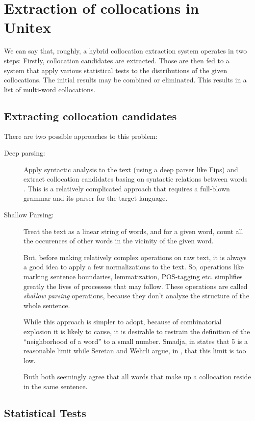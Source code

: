 \documentclass[a4paper,12pt,oneside]{article}
\begin{document}
\section{Extraction of collocations in Unitex}
We can say that, roughly, a hybrid collocation extraction system operates in two
steps: Firstly, collocation candidates are extracted. Those are then fed to a
system that apply various statistical tests to the distributions of the given
collocations. The initial results may be combined or eliminated. This results in
a list of multi-word collocations.

\subsection{Extracting collocation candidates}
There are two possible approaches to this problem: 

\begin{description}
\item[Deep parsing:] Apply syntactic analysis to the text (using a deep parser
like Fips\cite{fips2007}) and extract collocation candidates basing on syntactic
relations between words \cite{SeretanWehrli2006ACL}. This is a relatively
complicated approach that requires a full-blown grammar and its parser for the
target language.

\item[Shallow Parsing:] Treat the text as a linear string of words, and for a
given word, count all the occurences of other words in the vicinity of the given
word. 

But, before making relatively complex operations on raw text, it is always a
good idea to apply a few normalizations to the text. So, operations like marking
sentence boundaries, lemmatization, POS-tagging etc. simplifies greatly the
lives of processess that may follow\cite{smadja93}. These operations are called
\emph{shallow parsing} operations, because they don't analyze the structure of
the whole sentence.

While this approach is simpler to adopt, because of combinatorial explosion it
is likely to cause, it is desirable to restrain the definition of the
``neighborhood of a word'' to a small number. Smadja, in \cite{smadja93} states
that 5 is a reasonable limit while Seretan and Wehrli argue, in
\cite{SeretanWehrli2006ACL}, that this limit is too low. 

Buth both seemingly agree that all words that make up a collocation reside in
the same sentence.

\end{description}

\subsection{Statistical Tests}



\end{document}
